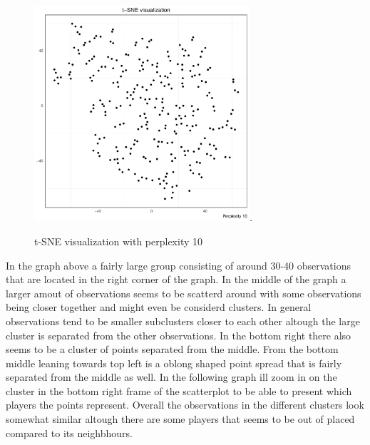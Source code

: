 \documentclass{article}
\begin{document}
\begin{figure}[H]
 \centering
 \includegraphics[height=8cm]{tsne10}.
 \caption{t-SNE visualization with perplexity 10}
 \label{figure:1}
\end{figure}

In the graph above a fairly large group consisting of around 30-40  observations that are located in the right corner of the graph. In the middle of the graph a larger amout of observations seems to be scatterd around with some observations being closer together and might even be considerd clusters. In general observations tend to be smaller subclusters closer to each other altough the large cluster is separated from the other observations. In the bottom right there also seems to be a cluster of points separated from the middle. From the bottom middle leaning towards top left is a oblong shaped point spread that is fairly separated from the middle as well. In the following graph ill zoom in on the cluster in the bottom right frame of the scatterplot to be able to present which players the points represent. Overall the observations in the different clusters look somewhat similar altough there are some players that seems to be out of placed compared to its neighbhours. 


\end{document}
